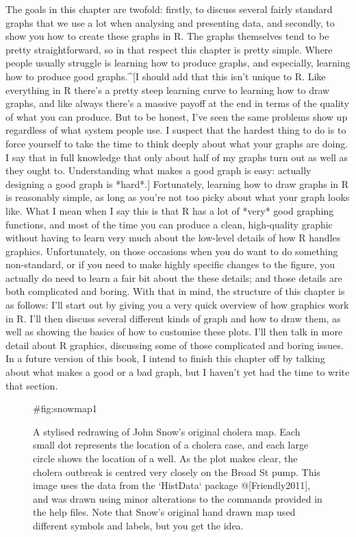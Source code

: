 The goals in this chapter are twofold: firstly, to discuss several fairly standard graphs that we use a lot when analysing and presenting data, and secondly, to show you how to create these graphs in R. The graphs themselves tend to be pretty straightforward, so in that respect this chapter is pretty simple. Where people usually struggle is learning how to produce graphs, and especially, learning how to produce good graphs.^[I should add that this isn't unique to R. Like everything in R there's a pretty steep learning curve to learning how to draw graphs, and like always there's a massive payoff at the end in terms of the quality of what you can produce. But to be honest, I've seen the same problems show up regardless of what system people use. I suspect that the hardest thing to do is to force yourself to take the time to think deeply about what your graphs are doing. I say that in full knowledge that only about half of my graphs turn out as well as they ought to. Understanding what makes a good graph is easy: actually designing a good graph is *hard*.] Fortunately, learning how to draw graphs in R is reasonably simple, as long as you're not too picky about what your graph looks like. What I mean when I say this is that R has a lot of *very* good graphing functions, and most of the time you can produce a clean, high-quality graphic without having to learn very much about the low-level details of how R handles graphics. Unfortunately, on those occasions when you do want to do something non-standard, or if you need to make highly specific changes to the figure, you actually do need to learn a fair bit about the these details; and those details are both complicated and boring. With that in mind, the structure of this chapter is as follows: I'll start out by giving you a very quick overview of how graphics work in R. I'll then discuss several different kinds of graph and how to draw them, as well as showing the basics of how to customise these plots. I'll then talk in more detail about R graphics, discussing some of those complicated and boring issues. In a future version of this book, I intend to finish this chapter off by talking about what makes a good or a bad graph, but I haven't yet had the time to write that section.

\begin{figure}[t!!]
\begin{center}
\caption{A stylised redrawing of John Snow's original cholera map. Each small dot represents the location of a cholera case, and each large circle shows the location of a well. As the plot makes clear, the cholera outbreak is centred very closely on the Broad St pump.  This image uses the data from the `HistData` package @[Friendly2011], and was drawn using minor alterations to the commands provided in the help files. Note that Snow's original hand drawn map used different symbols and labels, but you get the idea.}
{#fig:snowmap1}
\HR
\end{center}
\end{figure}




